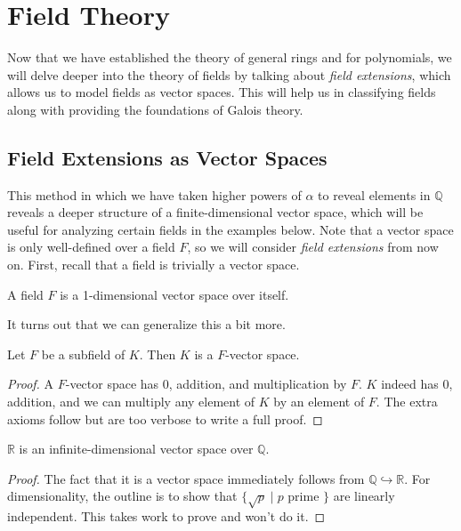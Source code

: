 \section{Field Theory}  

  Now that we have established the theory of general rings and for polynomials, we will delve deeper into the theory of fields by talking about \textit{field extensions}, which allows us to model fields as vector spaces. This will help us in classifying fields along with providing the foundations of Galois theory. 

\subsection{Field Extensions as Vector Spaces}

  This method in which we have taken higher powers of $\alpha$ to reveal elements in $\mathbb{Q}$ reveals a deeper structure of a finite-dimensional vector space, which will be useful for analyzing certain fields in the examples below. Note that a vector space is only well-defined over a field $F$, so we will consider \textit{field extensions} from now on. First, recall that a field is trivially a vector space. 

  \begin{lemma}
    A field $F$ is a 1-dimensional vector space over itself. 
  \end{lemma} 

  It turns out that we can generalize this a bit more. 

  \begin{theorem}
    \label{thm:fields_vector_space}
    Let $F$ be a subfield of $K$. Then $K$ is a $F$-vector space. 
  \end{theorem}
  \begin{proof}
    A $F$-vector space has $0$, addition, and multiplication by $F$. $K$ indeed has $0$, addition, and we can multiply any element of $K$ by an element of $F$. The extra axioms follow but are too verbose to write a full proof. 
  \end{proof}

  \begin{corollary} 
    $\mathbb{R}$ is an infinite-dimensional vector space over $\mathbb{Q}$. 
  \end{corollary}
  \begin{proof}
    The fact that it is a vector space immediately follows from $\mathbb{Q} \hookrightarrow \mathbb{R}$. For dimensionality, the outline is to show that $\{\sqrt{p} \mid p \text{ prime }\}$ are linearly independent. This takes work to prove and won't do it. 
  \end{proof}

